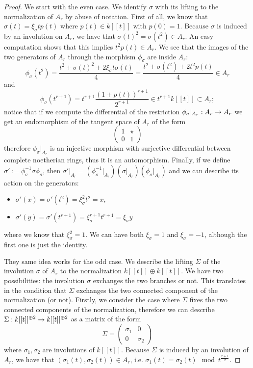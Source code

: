 \documentclass{alggeom}
\numberwithin{equation}{section}
\numberwithin{subsection}{section}
\theoremstyle{definition}
\theoremstyle{remark}
\newcommand\arr{\ifinner\to\else\longrightarrow\fi}
\begin{document}
\begin{proof}

We start with the even case. We identify $\sigma$ with its lifting to the normalization of $A_r$ by abuse of notation. First of all, we know that $\sigma(t)=\xi_{\sigma}tp(t)$ where $p(t)\in k[[t]]$ with $p(0)=1$. Because $\sigma$ is induced by an involution on $A_r$, we have that $\sigma(t)^2=\sigma(t^2) \in A_r$. An easy computation shows that this implies $t^2p(t) \in A_r$.
We see that the images of the two generators of $A_r$ through the morphism $\phi_{\sigma}$  are inside $A_r$:
$$\phi_{\sigma}(t^2)=\frac{t^2+\sigma(t)^2 + 2\xi_{\sigma}t\sigma(t)}{4}= \frac{t^2+\sigma(t^2)+2t^2p(t)}{4} \in A_r$$
and  
$$ \phi_{\sigma}(t^{r+1})=t^{r+1}\frac{(1+p(t))^{r+1}}{2^{r+1}}\in t^{r+1}k[[t]] \subset A_r;$$
notice that if we compute the differential of the restriction $\phi_{\sigma}\vert_{A_r}:A_r \arr A_r$ we get an endomorphism of the tangent space of $A_r$ of the form 
$$
\begin{pmatrix}
  1  &  \star \\
  0  &    1
\end{pmatrix} 
$$ 
therefore  $\phi_{\sigma}\vert_{A_r}$ is an injective morphism with surjective differential between complete noetherian rings, thus it is an automorphism. Finally, if we define $\sigma':=\phi_{\sigma}^{-1}\sigma\phi_{\sigma}$, then $\sigma'\vert_{A_r}=(\phi_{\sigma}^{-1}\vert_{A_r})(\sigma\vert_{A_r})(\phi_{\sigma}\vert_{A_r})$ and we can describe its action on the generators:
\begin{itemize}
	\item $\sigma'(x)=\sigma'(t^2)=\xi_{\sigma}^2 t^2 = x$,
	\item $\sigma'(y)=\sigma'(t^{r+1})=\xi_{\sigma}^{r+1} t^{r+1} = \xi_{\sigma} y$
\end{itemize} 
 where we know that $\xi_{\sigma}^2=1$. We can have both $\xi_{\sigma}=1$ and $\xi_{\sigma}=-1$, although the first one is just the identity.


They same idea works for the odd case. We describe the lifting $\Sigma$ of the involution $\sigma$ of $A_r$ to the normalization $k[[t]]\oplus k[[t]]$. We have two possibilities: the involution $\sigma$ exchanges the two branches or not. This translates in the condition that $\Sigma$ exchanges the two connected component of the normalization (or not). Firstly, we consider the case where $\Sigma$ fixes the two connected components of the normalization, therefore we can describe $\Sigma:k[[t]]^{\oplus 2}\arr k[[t]]^{\oplus 2}$ as a matrix of the form
$$
\Sigma=
\begin{pmatrix}
      \sigma_1 & 0 \\ 0 & \sigma_2
\end{pmatrix}
$$
where $\sigma_1,\sigma_2$ are involutions of $k[[t]]$. Because $\Sigma$ is induced by an involution of $A_r$, we have that $(\sigma_1(t),\sigma_2(t))\in A_r$, i.e. $\sigma_1(t)=\sigma_2(t) \mod t^{\frac{r+1}{2}}$.


\end{proof}
\end{document}
